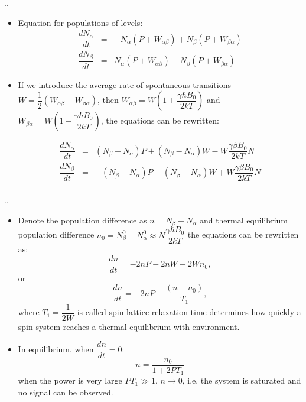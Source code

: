 \documentclass{beamer}
\begin{document}
\begin{frame}{\thesection.\thesubsection. \insertsubsection}
	\begin{itemize}[<+>]
		\item Equation for populations of levels:
		\begin{equation}
		\begin{array}{lcl}
		\dfrac{dN_{\alpha}}{dt} &=& -N_{\alpha}(P + W_{\alpha \beta}) + N_{\beta}(P+W_{\beta \alpha})  \\
		\dfrac{dN_{\beta}}{dt} &=&  N_{\alpha}(P + W_{\alpha \beta}) - N_{\beta}(P+W_{\beta \alpha})  
		\end{array}
		\end{equation}
		\item 
		If we introduce the average rate of spontaneous transitions $W = \dfrac{1}{2}(W_{\alpha \beta} - W_{\beta \alpha})$, then $W_{\alpha \beta} = W(1 + \dfrac{\gamma \hbar B_0}{2kT})$ and $W_{ \beta \alpha} = W(1 - \dfrac{\gamma \hbar B_0}{2kT})$, the equations can be rewritten:
		
		\begin{equation}
		\begin{array}{lcl}
		\dfrac{dN_{\alpha}}{dt} &=& (N_{\beta} - N_{\alpha})P + (N_{\beta} - N_{\alpha})W - W\dfrac{\gamma \beta B_0}{2kT}N \\
		\dfrac{dN_{\beta}}{dt} &=& -(N_{\beta} - N_{\alpha})P - (N_{\beta} - N_{\alpha})W + W\dfrac{\gamma \beta B_0}{2kT}N \\
		\end{array}
		\end{equation}		
	\end{itemize}
\end{frame}

\begin{frame}{\thesection.\thesubsection. \insertsubsection}
	\begin{itemize}[<+>]
		\item Denote the population difference as $n = N_{\beta} - N_{\alpha}$ and thermal equilibrium population difference $n_0 = N_{\beta}^0 - N_{\alpha}^0 \approx N\dfrac{\gamma \hbar B_0}{2kT}$ the equations can be rewritten as:
		\begin{equation}
		   \dfrac{dn}{dt} = - 2 n P - 2 n W + 2W n_0,
		\end{equation}
		or
		\begin{equation}
		    \dfrac{dn}{dt} = - 2 n P -\dfrac{ (n - n_0)}{T_1},
		\end{equation}
		where $T_1 = \dfrac{1}{2W}$ is called \alert{spin-lattice relaxation time} determines how quickly a spin system reaches a thermal equilibrium with environment.
		\item In equilibrium, when $\dfrac{dn}{dt} = 0$:
		\begin{equation}
			n = \dfrac{n_0}{1 + 2 P T_1}
		\end{equation}
		when the power is very large $PT_1 \gg 1$, $n \rightarrow 0$, i.e. the system is \alert{saturated} and no signal can be observed.
			
	\end{itemize}
\end{frame}
\end{document}
